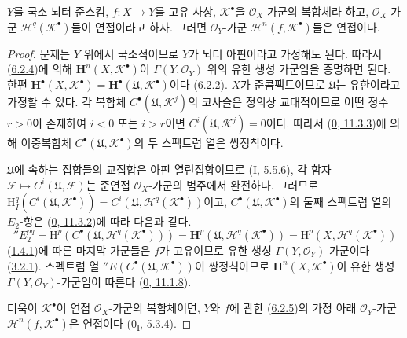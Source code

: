 \begin{proposition}[6.2.5]
\label{III.6.2.5-fr}
$Y$를 국소 뇌터 준스킴, $f:X\to Y$를 고유 사상,
$\mathscr K^\bullet$을 $\mathscr O_X$-가군의 복합체라 하고,
$\mathscr O_X$-가군 $\mathscr H^q(\mathscr K^\bullet)$들이
연접이라고 하자. 그러면 $\mathscr O_Y$-가군
$\mathscr H^n(f,\mathscr K^\bullet)$들은 연접이다.
\end{proposition}

\begin{proof}
문제는 $Y$ 위에서 국소적이므로 $Y$가 뇌터 아핀이라고 가정해도 된다.
따라서 (\hyperref[III.6.2.4-fr]{6.2.4})에 의해
$\mathbf H^n(X,\mathscr K^\bullet)$이
$\Gamma(Y,\mathscr O_Y)$ 위의 유한 생성 가군임을 증명하면 된다.
한편
$\mathbf H^\bullet(X,\mathscr K^\bullet)
=\mathbf H^\bullet(\mathfrak U,\mathscr K^\bullet)$이다
(\hyperref[III.6.2.2-fr]{6.2.2}). $X$가 준콤팩트이므로
$\mathfrak U$는 유한이라고 가정할 수 있다. 각 복합체
$C^\bullet(\mathfrak U,\mathscr K^j)$의 코사슬은 정의상 교대적이므로
어떤 정수 $r>0$이 존재하여 $i<0$ 또는 $i>r$이면
$C^i(\mathfrak U,\mathscr K^j)=0$이다. 따라서
(\hyperref[0.11.3.3-fr]{0, 11.3.3})에 의해 이중복합체
$C^\bullet(\mathfrak U,\mathscr K^\bullet)$의 두 스펙트럼 열은
쌍정칙이다.

$\mathfrak U$에 속하는 집합들의 교집합은 아핀 열린집합이므로
(\hyperref[I.5.5.6-ko]{I, 5.5.6}), 각 함자
$\mathscr F\mapsto C^i(\mathfrak U,\mathscr F)$는 준연접
$\mathscr O_X$-가군의 범주에서 완전하다. 그러므로
$\mathrm H_I^q(C^i(\mathfrak U,\mathscr K^\bullet))
=C^i(\mathfrak U,\mathscr H^q(\mathscr K^\bullet))$이고,
$C^\bullet(\mathfrak U,\mathscr K^\bullet)$의 둘째 스펙트럼 열의
$E_2$-항은 (\hyperref[0.11.3.2-fr]{0, 11.3.2})에 따라 다음과 같다.
\[
  ''E_2^{pq}
  =\mathrm H^p(C^\bullet(\mathfrak U,\mathscr H^q(\mathscr K^\bullet)))
  =\mathbf H^p(\mathfrak U,\mathscr H^q(\mathscr K^\bullet))
  =\mathrm H^p(X,\mathscr H^q(\mathscr K^\bullet))
\]
(\hyperref[III.1.4.1-fr]{1.4.1})에 따른 마지막 가군들은 $f$가
고유이므로 유한 생성 $\Gamma(Y,\mathscr O_Y)$-가군이다
(\hyperref[III.3.2.1-fr]{3.2.1}). 스펙트럼 열
$''E(C^\bullet(\mathfrak U,\mathscr K^\bullet))$이 쌍정칙이므로
$\mathbf H^n(X,\mathscr K^\bullet)$이 유한 생성
$\Gamma(Y,\mathscr O_Y)$-가군임이 따른다
(\hyperref[0.11.1.8-fr]{0, 11.1.8}).

더욱이 $\mathscr K^\bullet$이 연접 $\mathscr O_X$-가군의 복합체이면,
$Y$와 $f$에 관한 (\hyperref[III.6.2.5-fr]{6.2.5})의 가정 아래
$\mathscr O_Y$-가군 $\mathscr H^n(f,\mathscr K^\bullet)$은 연접이다
(\hyperref[0.5.3.4-ko]{0\textsubscript{I}, 5.3.4}).
\end{proof}

